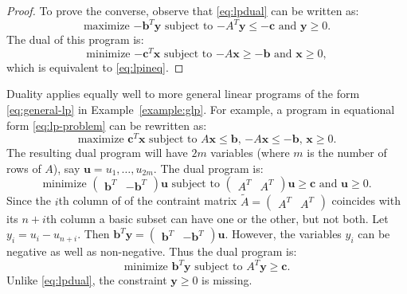 \documentclass{amsbook}
\newcommand{\xx}{\mathbf x}
\newcommand{\yy}{\mathbf y}
\newcommand{\cc}{\mathbf c}
\newcommand{\bb}{\mathbf b}
\theoremstyle{definition}
\theoremstyle{remark}
\begin{document}
\begin{proof}
  To prove the converse, observe that \eqref{eq:lpdual} can be written as:
  \begin{displaymath}
    \text{maximize $-\bb^T\yy$ subject to $-A^T\yy\leq -\cc$ and $\yy\geq 0$}.
  \end{displaymath}
  The dual of this program is:
  \begin{displaymath}
    \text{minimize $-\cc^T\xx$ subject to $-A\xx\geq -\bb$ and $\xx\geq 0$},
  \end{displaymath}
  which is equivalent to \eqref{eq:lpineq}.
\end{proof}
Duality applies equally well to more general linear programs of the form \eqref{eq:general-lp} in Example~\ref{example:glp}.
For example, a program in equational form \eqref{eq:lp-problem} can be rewritten as:
\begin{displaymath}
  \text{maximize $\cc^T\xx$ subject to  $A\xx\leq \bb$, $-A\xx\leq -\bb$, $\xx\geq 0$}.
\end{displaymath}
The resulting dual program will have $2m$ variables (where $m$ is the number of rows of $A$), say $\mathbf u=u_1,\dotsc,u_{2m}$.
The dual program is:
\begin{displaymath}
  \text{minimize $\begin{pmatrix}\bb^T&-\bb^T\end{pmatrix}\mathbf u$ subject to $\begin{pmatrix} A^T & A^T \end{pmatrix}\mathbf u \geq \cc$ and $\mathbf u\geq 0$}.
\end{displaymath}
Since the $i$th column of of the contraint matrix $\tilde A =
\begin{pmatrix}
  A^T & A^T
\end{pmatrix}$ coincides with its $n+i$th column a basic subset can have one or the other, but not both.
Let $y_i=u_i-u_{n+i}$.
Then $\bb^T\yy=\begin{pmatrix}\bb^T&-\bb^T\end{pmatrix}\mathbf u$.
However, the variables $y_i$ can be negative as well as non-negative.
Thus the dual program is:
\begin{displaymath}
  \text{minimize $\bb^T\yy$ subject to $A^T\yy\geq \cc$}.
\end{displaymath}
Unlike \eqref{eq:lpdual}, the constraint $\yy\geq 0$ is missing.
\end{document}
